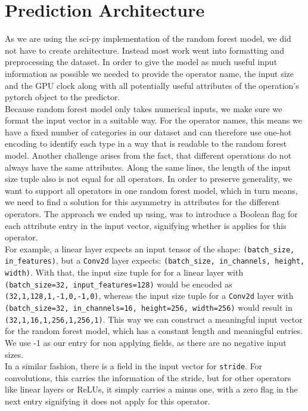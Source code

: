 \section{Prediction Architecture}
As we are using the sci-py implementation of the random forest model, we did not have to create architecture. Instead most work went into formatting and preprocessing the dataset. In order to give the model as much useful input information as possible we needed to provide the operator name, the input size and the GPU clock along with all potentially useful attributes of the operation's pytorch object to the predictor. \\
Because random forest model only takes numerical inputs, we make sure we format the input vector in a suitable way. For the operator names, this means we have a fixed number of categories in our dataset and can therefore use one-hot encoding to identify each type in a way that is readable to the random forest model. Another challenge arises from the fact, that different operations do not always have the same attributes. Along the same lines, the length of the input size tuple also is not equal for all operators. In order to preserve generality, we want to support all operators in one random forest model, which in turn means, we need to find a solution for this asymmetry in attributes for the different operators. The approach we ended up using, was to introduce a Boolean flag for each attribute entry in the input vector, signifying whether is applies for this operator.\\
For example, a linear layer expects an input tensor of the shape: \texttt{(batch\_size, in\_features)}, but a \texttt{Conv2d} layer expects: \texttt{(batch\_size, in\_channels, height, width)}. With that, the input size tuple for for a linear layer with \texttt{(batch\_size=32, input\_features=128)} would be encoded as \texttt{(32,1,128,1,-1,0,-1,0)}, whereas the input size tuple for a \texttt{Conv2d} layer with \texttt{(batch\_size=32, in\_channels=16, height=256, width=256)} would result in \texttt{(32,1,16,1,256,1,256,1)}. This way we can construct a meaningful input vector for the random forest model, which has a constant length and meaningful entries. We use -1 as our entry for non applying fields, as there are no negative input sizes. \\
In a similar fashion, there is a field in the input vector for \texttt{stride}. For convolutions, this carries the information of the stride, but for other operators like  linear layers or ReLUs, it simply carries a minus one, with a zero flag in the next entry signifying it does not apply for this operator. \\
